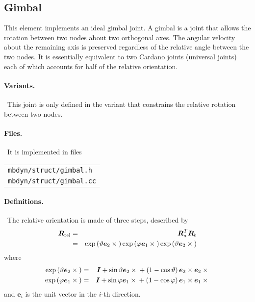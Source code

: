 \documentclass[10pt,dvips,fleqn]{report}
\newcommand{\T}[1]{\boldsymbol{#1}}
\begin{document}
\subsection{Gimbal}
\label{sec:GimbalRotationJoint}
This element implements an ideal gimbal joint.
A gimbal is a joint that allows the rotation between two nodes
about two orthogonal axes.
The angular velocity about the remaining axis is preserved regardless
of the relative angle between the two nodes.
It is essentially equivalent to two Cardano joints (universal joints)
each of which accounts for half of the relative orientation.

\paragraph{Variants.} \
This joint is only defined in the variant that constrains the relative
rotation between two nodes.

\paragraph{Files.} \
It is implemented in files

\begin{tabular}{l}
\texttt{mbdyn/struct/gimbal.h} \\
\texttt{mbdyn/struct/gimbal.cc}
\end{tabular}

\paragraph{Definitions.} \
The relative orientation is made of three steps, described by
\begin{eqnarray*}
	\T{R}_{\text{rel}}
	& = & \T{R}_a^T \T{R}_b \\
	& = & \llk{exp}\plbr{\vartheta \T{e}_2 \times{}}
		\llk{exp}\plbr{\varphi \T{e}_1 \times{}}
		\llk{exp}\plbr{\vartheta \T{e}_2 \times{}}
\end{eqnarray*}
where
\begin{eqnarray}
	\llk{exp}\plbr{\vartheta \T{e}_2 \times{}} & = &
		\T{I} + \sin\vartheta \T{e}_2\times{}
			+ \plbr{1 - \cos\vartheta}\T{e}_2\times\T{e}_2\times{}
		\label{eq:GIMBAL-EXP-THETA} \\
	\llk{exp}\plbr{\varphi \T{e}_1 \times{}} & = &
		\T{I} + \sin\varphi \T{e}_1\times{}
			+ \plbr{1 - \cos\varphi}\T{e}_1\times\T{e}_1\times{}
		\label{eq:GIMBAL-EXP-PHI}
\end{eqnarray}
and $\T{e}_i$ is the unit vector in the $i$-th direction.
\end{document}
